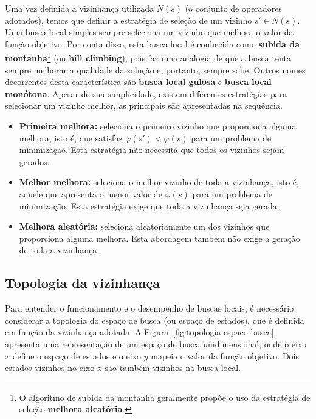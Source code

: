Uma vez definida a vizinhança utilizada $N(s)$ (o conjunto de operadores adotados), temos que definir a estratégia de seleção de um vizinho $s' \in N(s)$. Uma busca local simples sempre seleciona um vizinho que melhora o valor da função objetivo. Por conta disso, esta busca local é conhecida como \textbf{subida da montanha}\footnote{O algoritmo de subida da montanha geralmente propõe o uso da estratégia de seleção \textbf{melhora aleatória}.} (ou \textbf{hill climbing}), pois faz uma analogia de que a busca tenta sempre melhorar a qualidade da solução e, portanto, sempre sobe. Outros nomes decorrentes desta característica são \textbf{busca local gulosa} e \textbf{busca local monótona}. Apesar de sua simplicidade, existem diferentes estratégias para selecionar um vizinho melhor, as principais são apresentadas na sequência.

\begin{itemize}
	\item \textbf{Primeira melhora:} seleciona o primeiro vizinho que proporciona alguma melhora, isto é, que satisfaz $\varphi(s') < \varphi(s)$ para um problema de minimização. Esta estratégia não necessita que todos os vizinhos sejam gerados.
	
	\item \textbf{Melhor melhora:} seleciona o melhor vizinho de toda a vizinhança, isto é, aquele que apresenta o menor valor de $\varphi(s)$ para um problema de minimização. Esta estratégia exige que toda a vizinhança seja gerada.
	
	\item \textbf{Melhora aleatória:} seleciona aleatoriamente um dos vizinhos que proporciona alguma melhora. Esta abordagem também não exige a geração de toda a vizinhança.
\end{itemize}


\subsection{Topologia da vizinhança}

Para entender o funcionamento e o desempenho de buscas locais, é necessário considerar a topologia do espaço de busca (ou espaço de estados), que é definida em função da vizinhança adotada. A Figura~\ref{fig:topologia-espaco-busca} apresenta uma representação de um espaço de busca unidimensional, onde o eixo $x$ define o espaço de estados e o eixo $y$ mapeia o valor da função objetivo. Dois estados vizinhos no eixo $x$ são também vizinhos na busca local.

